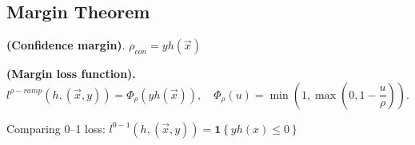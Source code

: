 \subsection{Margin Theorem}%
\label{sub:margin_theorem}

\begin{definition}
    \textbf{(Confidence margin)}.
    $ \rho_{con} = y h(\vec{x}) $
\end{definition}

\begin{definition}
    \textbf{(Margin loss function).}
    \[
        l^{\rho-ramp}(h, (\vec{x}, y)) = \Phi_\rho(y h(\vec{x})),
        \quad
        \Phi_\rho(u) = \min\left( 1, \max\left( 0, 1- \frac{u}{\rho} \right) \right).
    \]
\end{definition}
Comparing 0--1 loss: $ l^{0-1}(h, (\vec{x}, y)) = \mathbf{1}\left\{ yh(x) \le 0 \right\} $


